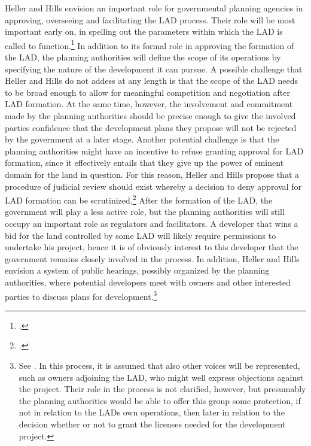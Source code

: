 Heller and Hills envision an important role for governmental planning agencies in approving, overseeing and facilitating the LAD process. Their role will be most important early on, in spelling out the parameters within which the LAD is called to function.\footcite[1489-1491]{heller08} In addition to its formal role in approving the formation of the LAD, the planning authorities will define the scope of its operations by specifying the nature of the development it can pursue. A possible challenge that Heller and Hills do not addess at any length is that the scope of the LAD needs to be broad enough to allow for meaningful competition and negotiation after LAD formation. At the same time, however, the involvement and commitment made by the planning authorities should be precise enough to give the involved parties confidence that the development plans they propose will not be rejected by the government at a later stage. Another potential challenge is that the planning authorities might have an incentive to refuse granting approval for LAD formation, since it effectively entails that they give up the power of eminent domain for the land in question. For this reason, Heller and Hills propose that a procedure of judicial review should exist whereby a decision to deny approval for LAD formation can be scrutinized.\footcite[1490]{heller08} After the formation of the LAD, the government will play a less active role, but the planning authorities will still occupy an important role as regulators and facilitators. A developer that wins a bid for the land controlled by some LAD will likely require permissions to undertake his project, hence it is of obviously interest to this developer that the government remains closely involved in the process. In addition, Heller and Hills envision a system of public hearings, possibly organized by the planning authorities, where potential developers meet with owners and other interested parties to discuss  plans for development.\footnote{See \cite[1490-1491]{heller08}. In this process, it is assumed that also other voices will be represented, such as owners adjoining the LAD, who might well express objections against the project. Their role in the process is not clarified, however, but presumably the planning authorities would be able to offer this group some protection, if not in relation to the LADs own operations, then later in relation to the decision whether or not to grant the licenses needed for the development project.}

